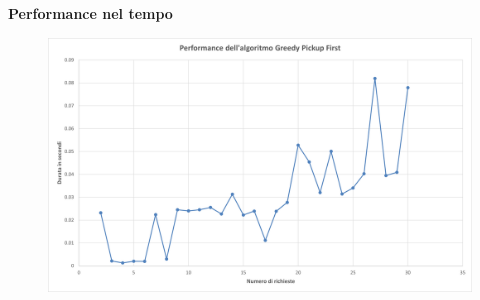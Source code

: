 \documentclass[9pt]{beamer}
\begin{document}
\begin{frame}[allowframebreaks]{\subsecname}
	\textbf{Performance nel tempo}
      	\begin{figure}[h]
	\centering
	\includegraphics[width=\textwidth]
	{../charts/04 Performance dell'algoritmo Greedy Pickup First}
	\end{figure}

\end{frame}
\end{document}

